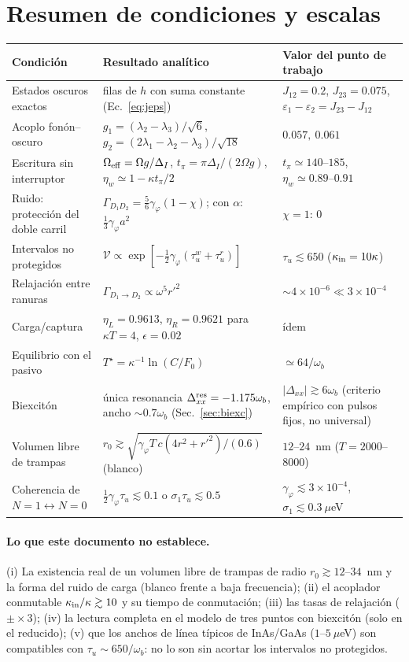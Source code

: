 \documentclass[11pt,a4paper]{article}
\newcommand{\wb}{\omega_b}
\newcommand{\gphi}{\gamma_\varphi}
\newcommand{\Dxx}{\Delta_{xx}}
\begin{document}
\section{Resumen de condiciones y escalas}\label{sec:resumen}
\begin{center}\small
\begin{tabular}{p{4.2cm}p{5.2cm}p{4.8cm}}\toprule
Condición & Resultado analítico & Valor del punto de trabajo\\\midrule
Estados oscuros exactos & filas de $h$ con suma constante (Ec.~\ref{eq:jeps}) & $J_{12}{=}0.2$, $J_{23}{=}0.075$, $\varepsilon_1{-}\varepsilon_2{=}J_{23}{-}J_{12}$\\
Acoplo fonón--oscuro & $g_1=(\lambda_2{-}\lambda_3)/\sqrt6$, $g_2=(2\lambda_1{-}\lambda_2{-}\lambda_3)/\sqrt{18}$ & $0.057,\ 0.061$\\
Escritura sin interruptor & $\Omega_{\rm eff}=\Omega g/\Delta_I$, $t_\pi=\pi\Delta_I/(2\Omega g)$, $\eta_w\simeq1-\kappa t_\pi/2$ & $t_\pi\simeq140$--$185$, $\eta_w\simeq0.89$--$0.91$\\
Ruido: protección del doble carril & $\Gamma_{D_1D_2}=\tfrac56\gphi(1-\chi)$; con $\alpha$: $\tfrac13\gphi a^2$ & $\chi=1$: 0\\
Intervalos no protegidos & $\mathcal V\propto\exp[-\tfrac12\gphi(\tau_u^w+\tau_u^r)]$ & $\tau_u\lesssim650$ ($\kappa_{\rm in}=10\kappa$)\\
Relajación entre ranuras & $\Gamma_{D_1\to D_2}\propto\omega^5r'^2$ & $\sim4\times10^{-6}\ll3\times10^{-4}$\\
Carga/captura & $\eta_L=0.9613$, $\eta_R=0.9621$ para $\kappa T=4$, $\epsilon=0.02$ & ídem\\
Equilibrio con el pasivo & $T^\star=\kappa^{-1}\ln(C/F_0)$ & $\simeq64/\wb$\\
Biexcitón & única resonancia $\Dxx^{\rm res}=-1.175\wb$, ancho $\sim0.7\wb$ (Sec.~\ref{sec:biexc}) & $|\Dxx|\gtrsim6\wb$ (criterio empírico con pulsos fijos, no universal)\\
Volumen libre de trampas & $r_0\gtrsim\sqrt{\gphi T\,c(4r^2{+}r'^2)/(0.6)}$ (blanco) & $12$--$24$~nm ($T{=}2000$--$8000$)\\
Coherencia de $N{=}1\leftrightarrow N{=}0$ & $\tfrac12\gphi\tau_u\lesssim0.1$ o $\sigma_1\tau_u\lesssim0.5$ & $\gphi\lesssim3{\times}10^{-4}$, $\sigma_1\lesssim0.3~\mu$eV\\\bottomrule
\end{tabular}
\end{center}

\paragraph{Lo que este documento no establece.}
(i) La existencia real de un volumen libre de trampas de radio $r_0\gtrsim12$--$34$~nm y la forma del ruido de carga (blanco frente a baja frecuencia);
(ii) el acoplador conmutable $\kappa_{\rm in}/\kappa\gtrsim10$ y su tiempo de conmutación;
(iii) las tasas de relajación ($\pm\times3$);
(iv) la lectura completa en el modelo de tres puntos con biexcitón (solo en el reducido);
(v) que los anchos de línea típicos de InAs/GaAs ($1$--$5~\mu$eV) son compatibles con $\tau_u\sim650/\wb$: no lo son sin acortar los intervalos no protegidos.
\end{document}

